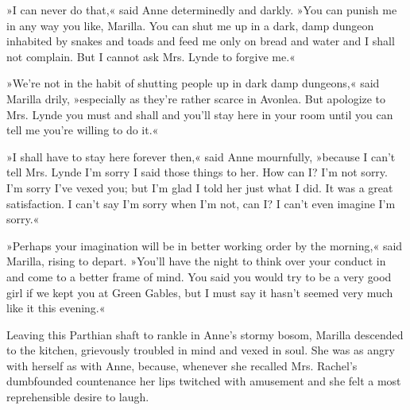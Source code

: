 »I can never do that,« said Anne determinedly and darkly. »You can punish me in any way you like, Marilla. You can shut me up in a dark, damp dungeon inhabited by snakes and toads and feed me only on bread and water and I shall not complain. But I cannot ask Mrs. Lynde to forgive me.«

»We're not in the habit of shutting people up in dark damp dungeons,« said Marilla drily, »especially as they're rather scarce in Avonlea. But apologize to Mrs. Lynde you must and shall and you'll stay here in your room until you can tell me you're willing to do it.«

»I shall have to stay here forever then,« said Anne mournfully, »because I can't tell Mrs. Lynde I'm sorry I said those things to her. How can I? I'm not sorry. I'm sorry I've vexed you; but I'm glad I told her just what I did. It was a great satisfaction. I can't say I'm sorry when I'm not, can I? I can't even imagine I'm sorry.«

»Perhaps your imagination will be in better working order by the morning,« said Marilla, rising to depart. »You'll have the night to think over your conduct in and come to a better frame of mind. You said you would try to be a very good girl if we kept you at Green Gables, but I must say it hasn't seemed very much like it this evening.«

Leaving this Parthian shaft to rankle in Anne's stormy bosom, Marilla descended to the kitchen, grievously troubled in mind and vexed in soul. She was as angry with herself as with Anne, because, whenever she recalled Mrs. Rachel's dumbfounded countenance her lips twitched with amusement and she felt a most reprehensible desire to laugh.